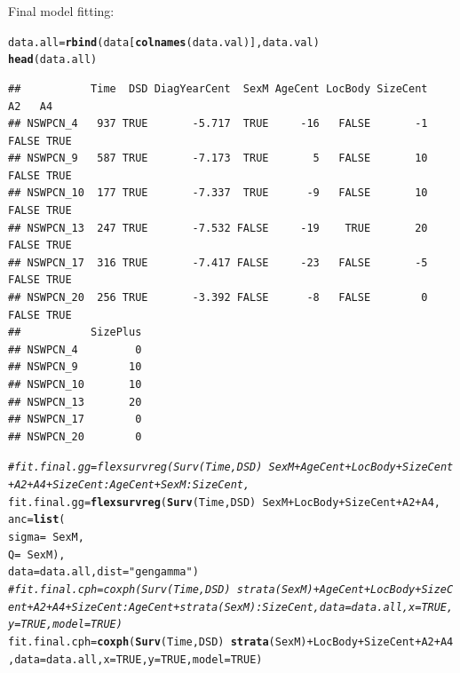 \documentclass{article}\usepackage[]{graphicx}\usepackage[]{color}
\makeatletter
\newcommand{\hlnum}[1]{\textcolor[rgb]{0.686,0.059,0.569}{#1}}%
\newcommand{\hlstr}[1]{\textcolor[rgb]{0.192,0.494,0.8}{#1}}%
\newcommand{\hlcom}[1]{\textcolor[rgb]{0.678,0.584,0.686}{\textit{#1}}}%
\newcommand{\hlopt}[1]{\textcolor[rgb]{0,0,0}{#1}}%
\newcommand{\hlstd}[1]{\textcolor[rgb]{0.345,0.345,0.345}{#1}}%
\newcommand{\hlkwb}[1]{\textcolor[rgb]{0.69,0.353,0.396}{#1}}%
\newcommand{\hlkwc}[1]{\textcolor[rgb]{0.333,0.667,0.333}{#1}}%
\newcommand{\hlkwd}[1]{\textcolor[rgb]{0.737,0.353,0.396}{\textbf{#1}}}%
\newenvironment{kframe}{%
 \def\at@end@of@kframe{}%
 \ifinner\ifhmode%
  \def\at@end@of@kframe{\end{minipage}}%
  \begin{minipage}{\columnwidth}%
 \fi\fi%
 \def\FrameCommand##1{\hskip\@totalleftmargin \hskip-\fboxsep
 \colorbox{shadecolor}{##1}\hskip-\fboxsep
     \hskip-\linewidth \hskip-\@totalleftmargin \hskip\columnwidth}%
 \MakeFramed {\advance\hsize-\width
   \@totalleftmargin\z@ \linewidth\hsize
   \@setminipage}}%
 {\par\unskip\endMakeFramed%
 \at@end@of@kframe}
\newenvironment{knitrout}{}{} %
\makeatother
\begin{document}
Final model fitting:
\begin{knitrout}
\color{fgcolor}\begin{kframe}
\begin{alltt}
\hlstd{data.all} \hlkwb{=} \hlkwd{rbind}\hlstd{(data[}\hlkwd{colnames}\hlstd{(data.val)], data.val)}
\hlkwd{head}\hlstd{(data.all)}
\end{alltt}
\begin{verbatim}
##           Time  DSD DiagYearCent  SexM AgeCent LocBody SizeCent    A2   A4
## NSWPCN_4   937 TRUE       -5.717  TRUE     -16   FALSE       -1 FALSE TRUE
## NSWPCN_9   587 TRUE       -7.173  TRUE       5   FALSE       10 FALSE TRUE
## NSWPCN_10  177 TRUE       -7.337  TRUE      -9   FALSE       10 FALSE TRUE
## NSWPCN_13  247 TRUE       -7.532 FALSE     -19    TRUE       20 FALSE TRUE
## NSWPCN_17  316 TRUE       -7.417 FALSE     -23   FALSE       -5 FALSE TRUE
## NSWPCN_20  256 TRUE       -3.392 FALSE      -8   FALSE        0 FALSE TRUE
##           SizePlus
## NSWPCN_4         0
## NSWPCN_9        10
## NSWPCN_10       10
## NSWPCN_13       20
## NSWPCN_17        0
## NSWPCN_20        0
\end{verbatim}
\begin{alltt}
\hlcom{#fit.final.gg = flexsurvreg(Surv(Time, DSD) ~ SexM + AgeCent + LocBody + SizeCent + A2 + A4 + SizeCent:AgeCent + SexM:SizeCent,}
\hlstd{fit.final.gg} \hlkwb{=} \hlkwd{flexsurvreg}\hlstd{(}\hlkwd{Surv}\hlstd{(Time, DSD)} \hlopt{~} \hlstd{SexM} \hlopt{+} \hlstd{LocBody} \hlopt{+} \hlstd{SizeCent} \hlopt{+} \hlstd{A2} \hlopt{+} \hlstd{A4,}
        \hlkwc{anc} \hlstd{=} \hlkwd{list}\hlstd{(}
                \hlkwc{sigma} \hlstd{=} \hlopt{~} \hlstd{SexM,}
                \hlkwc{Q} \hlstd{=} \hlopt{~} \hlstd{SexM),}
        \hlkwc{data} \hlstd{= data.all,} \hlkwc{dist} \hlstd{=} \hlstr{"gengamma"}\hlstd{)}
\hlcom{# fit.final.cph = coxph(Surv(Time, DSD) ~ strata(SexM)+AgeCent+LocBody+SizeCent+A2+A4+SizeCent:AgeCent+strata(SexM):SizeCent, data = data.all, x = TRUE, y = TRUE, model = TRUE)}
\hlstd{fit.final.cph} \hlkwb{=} \hlkwd{coxph}\hlstd{(}\hlkwd{Surv}\hlstd{(Time, DSD)} \hlopt{~} \hlkwd{strata}\hlstd{(SexM)} \hlopt{+} \hlstd{LocBody} \hlopt{+} \hlstd{SizeCent} \hlopt{+} \hlstd{A2} \hlopt{+} \hlstd{A4,} \hlkwc{data} \hlstd{= data.all,} \hlkwc{x} \hlstd{=} \hlnum{TRUE}\hlstd{,} \hlkwc{y} \hlstd{=} \hlnum{TRUE}\hlstd{,} \hlkwc{model} \hlstd{=} \hlnum{TRUE}\hlstd{)}

\end{alltt}
\end{kframe}
\end{knitrout}
\end{document}
